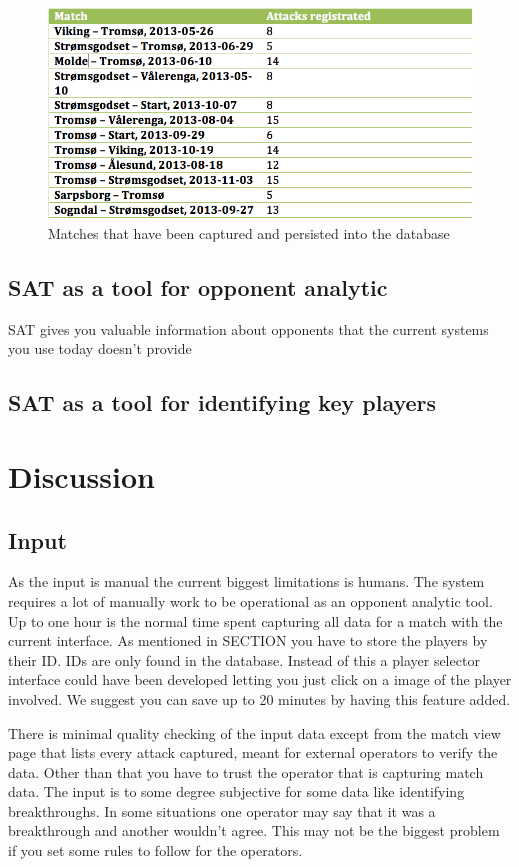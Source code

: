 \begin{figure}[ht!]
\centering
\includegraphics[width=1\textwidth]{images/general/matched_regged.png}
\caption{Matches that have been captured and persisted into the database}
\label{fig:matches_regged}
\end{figure}

\subsection{SAT as a tool for opponent analytic}


SAT gives you valuable information about opponents that the current systems you use today doesn't provide


\subsection{SAT as a tool for identifying key players}

\section{Discussion}
\subsection{Input}

As the input is manual the current biggest limitations is humans. The system requires a lot of manually work to be operational as an opponent analytic tool. Up to one hour is the normal time spent capturing all data for a match with the current interface. As mentioned in SECTION you have to store the players by their ID. IDs are only found in the database. Instead of this a player selector interface could have been developed letting you just click on a image of the player involved. We suggest you can save up to 20 minutes by having this feature added.

There is minimal quality checking of the input data except from the match view page that lists every attack captured, meant for external operators to verify the data. Other than that you have to trust the operator that is capturing match data. The input is to some degree subjective for some data like identifying breakthroughs. In some situations one operator may say that it was a breakthrough and another wouldn't agree. This may not be the biggest problem if you set some rules to follow for the operators.



